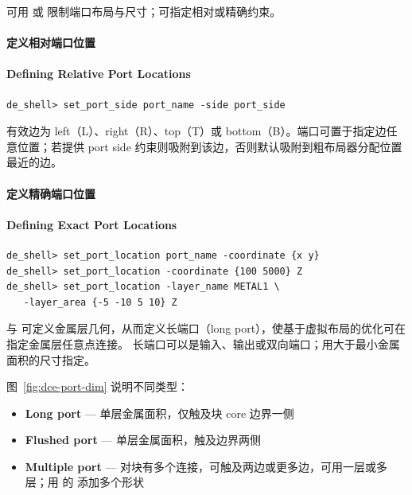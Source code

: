 可用  或  限制端口布局与尺寸；可指定相对或精确约束。

\paragraph{定义相对端口位置}
\paragraph*{Defining Relative Port Locations}

\begin{lstlisting}
de_shell> set_port_side port_name -side port_side
\end{lstlisting}

有效边为 left（L）、right（R）、top（T）或 bottom（B）。端口可置于指定边任意位置；若提供 port side 约束则吸附到该边，否则默认吸附到粗布局器分配位置最近的边。


\paragraph{定义精确端口位置}
\paragraph*{Defining Exact Port Locations}

\begin{lstlisting}
de_shell> set_port_location port_name -coordinate {x y}
de_shell> set_port_location -coordinate {100 5000} Z
de_shell> set_port_location -layer_name METAL1 \
   -layer_area {-5 -10 5 10} Z
\end{lstlisting}

 与  可定义金属层几何，从而定义长端口（long port），使基于虚拟布局的优化可在指定金属层任意点连接。
长端口可以是输入、输出或双向端口；用大于最小金属面积的尺寸指定。

图~\ref{fig:dce-port-dim} 说明不同类型：
\begin{itemize}
  \item \textbf{Long port} — 单层金属面积，仅触及块 core 边界一侧
  \item \textbf{Flushed port} — 单层金属面积，触及边界两侧
  \item \textbf{Multiple port} — 对块有多个连接，可触及两边或更多边，可用一层或多层；用  的  添加多个形状
\end{itemize}

